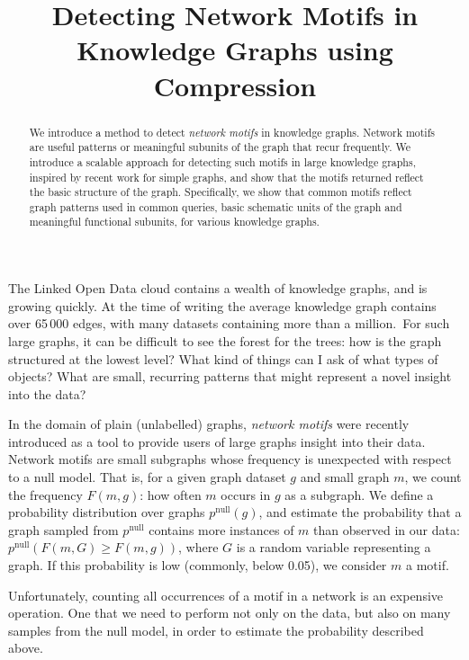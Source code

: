 \documentclass[11pt]{article}
\title{Detecting Network Motifs in Knowledge Graphs using Compression}
\begin{document}
\maketitle

\begin{abstract}
\noindent We introduce a method to detect \emph{network motifs} in knowledge graphs. Network motifs are useful patterns or meaningful subunits of the graph that recur frequently. We introduce a scalable approach for detecting such motifs in large knowledge graphs, inspired by recent work for simple graphs, and show that the motifs returned reflect the basic structure of the graph. Specifically, we show that common motifs reflect graph patterns used in common queries, basic schematic units of the graph and meaningful functional subunits, for various knowledge graphs.
\end{abstract}

\noindent The Linked Open Data cloud contains a wealth of knowledge graphs, and is growing quickly. At the time of writing the average knowledge graph contains over 65\,000 edges, with many datasets containing more than a million.\footnotemark~For such large graphs, it can be difficult to see the forest for the trees: how is the graph structured at the lowest level? What kind of things can I ask of what types of objects? What are small, recurring patterns that might represent a novel insight into the data?


In the domain of plain (unlabelled) graphs, \emph{network motifs} \cite{milo2002network} were recently introduced as a tool to provide users of large graphs insight into their data. Network motifs are small subgraphs whose frequency is unexpected with respect to a null model. That is, for a given graph dataset $g$ and small graph $m$, we count the frequency $F(m, g)$: how often $m$ occurs in $g$ as a subgraph. We define a probability distribution over graphs $p^\text{null}(g)$, and estimate the probability that a graph sampled from $p^\text{null}$ contains more instances of $m$ than observed in our data: $p^\text{null}(F(m, G) \geq F(m, g))$, where $G$ is a random variable representing a graph. If this probability is low (commonly, below 0.05), we consider $m$ a motif. \footnotemark

Unfortunately, counting all occurrences of a motif in a network is an expensive operation. One that we need to perform not only on the data, but also on many samples from the null model, in order to estimate the probability described above.
\end{document}
